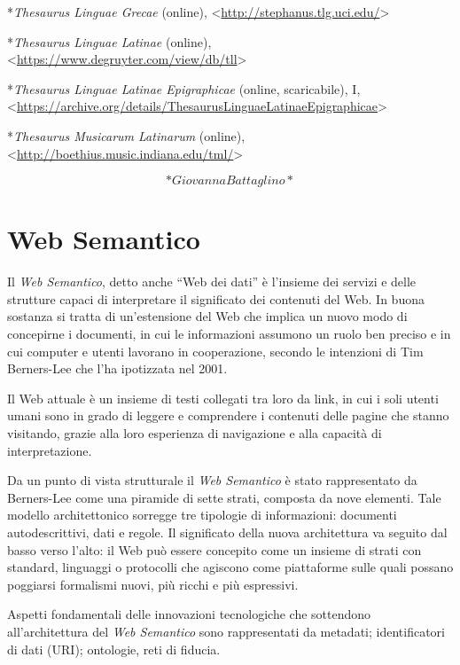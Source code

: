 \documentclass[
  b5paper,
  twoside,
  11pt,
  chapterprefix=false,
  bibliography=totocnumbered,
  listof=flat]{scrbook}
\begin{document}
*\emph{Thesaurus Linguae Grecae} (online),
\textless{}\href{http://stephanus.tlg.uci.edu/}{{http://stephanus.tlg.uci.edu/}}\textgreater{}

*\emph{Thesaurus Linguae Latinae} (online),
\textless{}\href{https://www.degruyter.com/view/db/tll}{{https://www.degruyter.com/view/db/tll}}\textgreater{}

*\emph{Thesaurus Linguae Latinae Epigraphicae} (online, scaricabile), I,
\textless{}\href{https://archive.org/details/ThesaurusLinguaeLatinaeEpigraphicae}{{https://archive.org/details/ThesaurusLinguaeLatinaeEpigraphicae}}\textgreater{}

*\emph{Thesaurus Musicarum Latinarum} (online),
\textless{}\href{http://boethius.music.indiana.edu/tml/}{{http://boethius.music.indiana.edu/tml/}}\textgreater{}

\[*Giovanna Battaglino*\]

\hypertarget{web-semantico}{%
\chapter{Web Semantico}\label{web-semantico}}

Il \emph{Web Semantico}, detto anche \enquote{Web dei dati} è l'insieme dei servizi
e delle strutture capaci di interpretare il significato dei contenuti
del Web. In buona sostanza si tratta di un'estensione del Web che
implica un nuovo modo di concepirne i documenti, in cui le informazioni
assumono un ruolo ben preciso e in cui computer e utenti lavorano in
cooperazione, secondo le intenzioni di Tim Berners-Lee che l'ha
ipotizzata nel 2001.

Il Web attuale è un insieme di testi collegati tra loro da link, in cui
i soli utenti umani sono in grado di leggere e comprendere i contenuti
delle pagine che stanno visitando, grazie alla loro esperienza di
navigazione e alla capacità di interpretazione.

Da un punto di vista strutturale il \emph{Web Semantico} è stato
rappresentato da Berners-Lee come una piramide di sette strati, composta
da nove elementi. Tale modello architettonico sorregge tre tipologie di
informazioni: documenti autodescrittivi, dati e regole. Il significato
della nuova architettura va seguito dal basso verso l'alto: il Web può
essere concepito come un insieme di strati con standard, linguaggi o
protocolli che agiscono come piattaforme sulle quali possano poggiarsi
formalismi nuovi, più ricchi e più espressivi.

Aspetti fondamentali delle innovazioni tecnologiche che sottendono
all'architettura del \emph{Web Semantico} sono rappresentati da metadati;
identificatori di dati (URI); ontologie, reti di fiducia.
\end{document}
